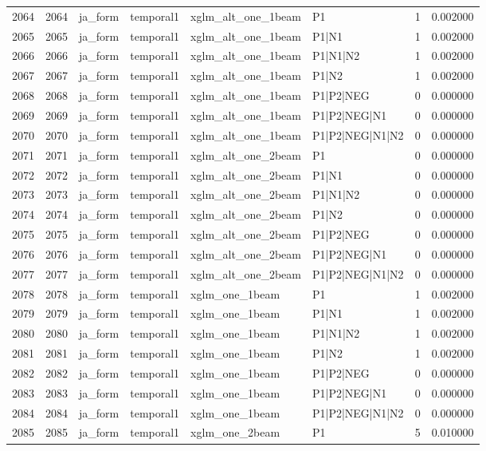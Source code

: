 \begin{tabular}{lrllllrr}
2064 & 2064 & ja_form & temporal1 & xglm_alt_one_1beam & P1 & 1 & 0.002000 \\
2065 & 2065 & ja_form & temporal1 & xglm_alt_one_1beam & P1|N1 & 1 & 0.002000 \\
2066 & 2066 & ja_form & temporal1 & xglm_alt_one_1beam & P1|N1|N2 & 1 & 0.002000 \\
2067 & 2067 & ja_form & temporal1 & xglm_alt_one_1beam & P1|N2 & 1 & 0.002000 \\
2068 & 2068 & ja_form & temporal1 & xglm_alt_one_1beam & P1|P2|NEG & 0 & 0.000000 \\
2069 & 2069 & ja_form & temporal1 & xglm_alt_one_1beam & P1|P2|NEG|N1 & 0 & 0.000000 \\
2070 & 2070 & ja_form & temporal1 & xglm_alt_one_1beam & P1|P2|NEG|N1|N2 & 0 & 0.000000 \\
2071 & 2071 & ja_form & temporal1 & xglm_alt_one_2beam & P1 & 0 & 0.000000 \\
2072 & 2072 & ja_form & temporal1 & xglm_alt_one_2beam & P1|N1 & 0 & 0.000000 \\
2073 & 2073 & ja_form & temporal1 & xglm_alt_one_2beam & P1|N1|N2 & 0 & 0.000000 \\
2074 & 2074 & ja_form & temporal1 & xglm_alt_one_2beam & P1|N2 & 0 & 0.000000 \\
2075 & 2075 & ja_form & temporal1 & xglm_alt_one_2beam & P1|P2|NEG & 0 & 0.000000 \\
2076 & 2076 & ja_form & temporal1 & xglm_alt_one_2beam & P1|P2|NEG|N1 & 0 & 0.000000 \\
2077 & 2077 & ja_form & temporal1 & xglm_alt_one_2beam & P1|P2|NEG|N1|N2 & 0 & 0.000000 \\
2078 & 2078 & ja_form & temporal1 & xglm_one_1beam & P1 & 1 & 0.002000 \\
2079 & 2079 & ja_form & temporal1 & xglm_one_1beam & P1|N1 & 1 & 0.002000 \\
2080 & 2080 & ja_form & temporal1 & xglm_one_1beam & P1|N1|N2 & 1 & 0.002000 \\
2081 & 2081 & ja_form & temporal1 & xglm_one_1beam & P1|N2 & 1 & 0.002000 \\
2082 & 2082 & ja_form & temporal1 & xglm_one_1beam & P1|P2|NEG & 0 & 0.000000 \\
2083 & 2083 & ja_form & temporal1 & xglm_one_1beam & P1|P2|NEG|N1 & 0 & 0.000000 \\
2084 & 2084 & ja_form & temporal1 & xglm_one_1beam & P1|P2|NEG|N1|N2 & 0 & 0.000000 \\
2085 & 2085 & ja_form & temporal1 & xglm_one_2beam & P1 & 5 & 0.010000 \\

\end{tabular}
